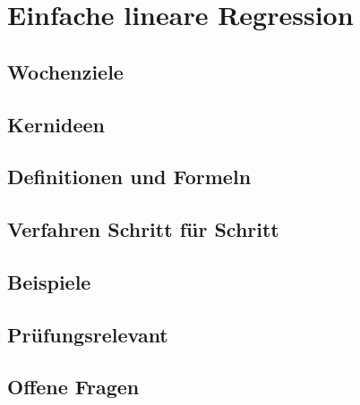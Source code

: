 \chapter{Einfache lineare Regression}
\label{kap:06-einfache-regression}

\section*{Wochenziele}
\begin{wochenziele}
\end{wochenziele}

\section{Kernideen}

\section{Definitionen und Formeln}

\section{Verfahren Schritt für Schritt}

\section{Beispiele}

\section{Prüfungsrelevant}

\section{Offene Fragen}

